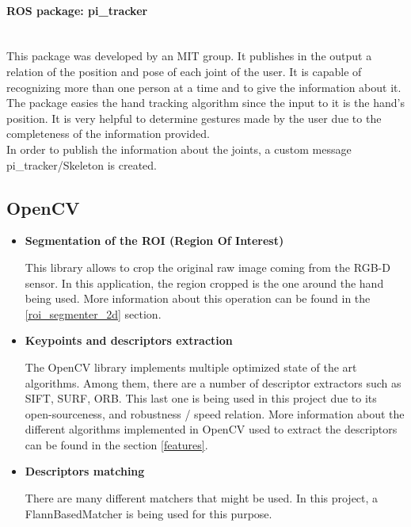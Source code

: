 		\paragraph{ROS package: pi\_tracker}\mbox{} \\

		This package was developed by an MIT group. It publishes in the output a relation of the position and pose of each joint of the user. It is capable of recognizing more than one person at a time and to give the information about it. 
		\\

		The package easies the hand tracking algorithm since the input to it is the hand's position. It is very helpful to determine gestures made by the user due to the completeness of the information provided. 
		\\

		In order to publish the information about the joints, a custom message pi\_tracker/Skeleton is created. 

	\subsection{OpenCV}
		\begin{itemize}
		\item\textbf{Segmentation of the ROI (Region Of Interest)\\ }

		This library allows to crop the original raw image coming
		from the RGB-D sensor. In this application, the region cropped is the one around the hand being used. More information about this operation can be found in the \ref{roi_segmenter_2d} section. 
		

		\item\textbf{ {Keypoints and descriptors extraction\\ }}

		 The OpenCV library implements multiple optimized state of the art algorithms. Among them, there are a number of descriptor extractors such as SIFT, SURF, ORB. This last one is being used in this project due to its open-sourceness, and robustness / speed relation. More information about the different algorithms implemented in OpenCV used to extract the descriptors can be found in the section \ref{features}.


		\item\textbf{ {Descriptors matching\\ } }

		There are many different matchers that might be used. In this project, a FlannBasedMatcher
		is being used for this purpose. 
		\end{itemize}

